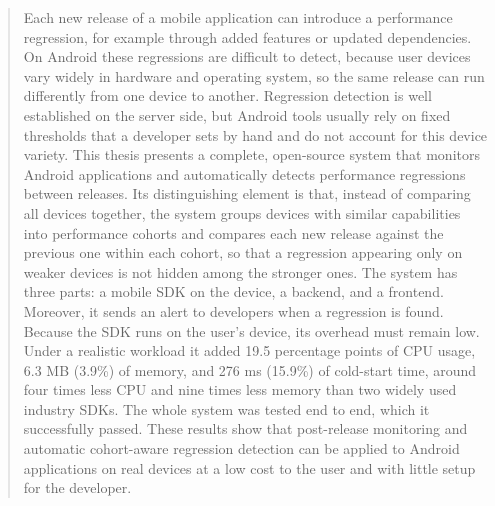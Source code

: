 \begin{abstract}


Each new release of a mobile application can introduce a performance regression, for example through added features or updated dependencies. On Android these regressions are difficult to detect, because user devices vary widely in hardware and operating system, so the same release can run differently from one device to another. Regression detection is well established on the server side, but Android tools usually rely on fixed thresholds that a developer sets by hand and do not account for this device variety. This thesis presents a complete, open-source system that monitors Android applications and automatically detects performance regressions between releases. Its distinguishing element is that, instead of comparing all devices together, the system groups devices with similar capabilities into performance cohorts and compares each new release against the previous one within each cohort, so that a regression appearing only on weaker devices is not hidden among the stronger ones. The system has three parts: a mobile SDK on the device, a backend, and a frontend. Moreover, it sends an alert to developers when a regression is found. Because the SDK runs on the user's device, its overhead must remain low. Under a realistic workload it added 19.5 percentage points of CPU usage, 6.3 MB (3.9\%) of memory, and 276 ms (15.9\%) of cold-start time, around four times less CPU and nine times less memory than two widely used industry SDKs. The whole system was tested end to end, which it successfully passed. These results show that post-release monitoring and automatic cohort-aware regression detection can be applied to Android applications on real devices at a low cost to the user and with little setup for the developer.

\end{abstract}